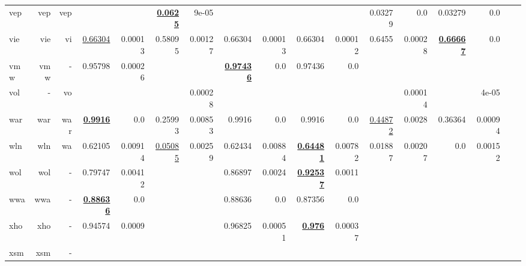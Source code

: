 \documentclass[11pt]{article}
\begin{document}
\begin{table*}[h]
{\begin{tabular}{lrrrrrrrrrrrrrrrr}
vep         & vep         & vep         &          &          & \textbf{\underline{0.0625}}         & 9e-05         &          &          &          &          & 0.03279         & 0.0         & 0.03279         & 0.0         \\
vie         & vie         & vi         & \underline{0.66304}         & 0.00013         & 0.58095         & 0.00127         & 0.66304         & 0.00013         & 0.66304         & 0.00012         & 0.6455         & 0.00028         & \textbf{\underline{0.66667}}         & 0.0         \\
vmw         & vmw         & -         & 0.95798         & 0.00026         &          &          & \textbf{\underline{0.97436}}         & 0.0         & 0.97436         & 0.0         &          &          &          &          \\
vol         & -         & vo         &          &          &          & 0.00028         &          &          &          &          &          & 0.00014         &          & 4e-05         \\
war         & war         & war         & \textbf{\underline{0.9916}}         & 0.0         & 0.25993         & 0.00853         & 0.9916         & 0.0         & 0.9916         & 0.0         & \underline{0.44872}         & 0.0028         & 0.36364         & 0.00094         \\
wln         & wln         & wa         & 0.62105         & 0.00914         & \underline{0.05085}         & 0.00259         & 0.62434         & 0.00884         & \textbf{\underline{0.64481}}         & 0.00782         & 0.01887         & 0.00207         & 0.0         & 0.00152         \\
wol         & wol         & -         & 0.79747         & 0.00412         &          &          & 0.86897         & 0.0024         & \textbf{\underline{0.92537}}         & 0.0011         &          &          &          &          \\
wwa         & wwa         & -         & \textbf{\underline{0.88636}}         & 0.0         &          &          & 0.88636         & 0.0         & 0.87356         & 0.0         &          &          &          &          \\
xho         & xho         & -         & 0.94574         & 0.0009         &          &          & 0.96825         & 0.00051         & \textbf{\underline{0.976}}         & 0.00037         &          &          &          &          \\
xsm         & xsm         & -         &          &          &          &          &          &          &          &          &          &          &          &          \\

\end{tabular}}
\end{table*}
\end{document}
